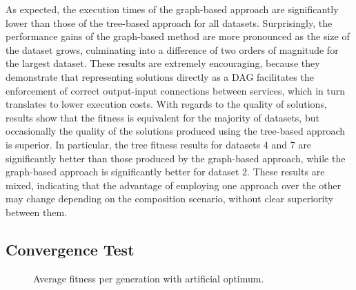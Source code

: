 As expected, the execution times of the graph-based approach are significantly lower than those of the tree-based approach for all datasets. Surprisingly, the performance gains of the graph-based method are more pronounced as the size of the dataset grows, culminating into a difference of two orders of magnitude for the largest dataset. These results are extremely encouraging, because they demonstrate that representing solutions directly as a DAG facilitates the enforcement of correct output-input connections between services, which in turn translates to lower execution costs. With regards to the quality of solutions, results show that the fitness is equivalent for the majority of datasets, but occasionally the quality of the solutions produced using the tree-based approach is superior. In particular, the tree fitness results for datasets 4 and 7 are significantly better than those produced by the graph-based approach, while the graph-based approach is significantly better for dataset 2. These results are mixed, indicating that the advantage of employing one approach over the other may change depending on the composition scenario, without clear superiority between them.

\subsection{Convergence Test}

\begin{figure}
\centerline{
}
\caption{Average fitness per generation with artificial optimum.}
\label{fig:convergence}
\end{figure}

